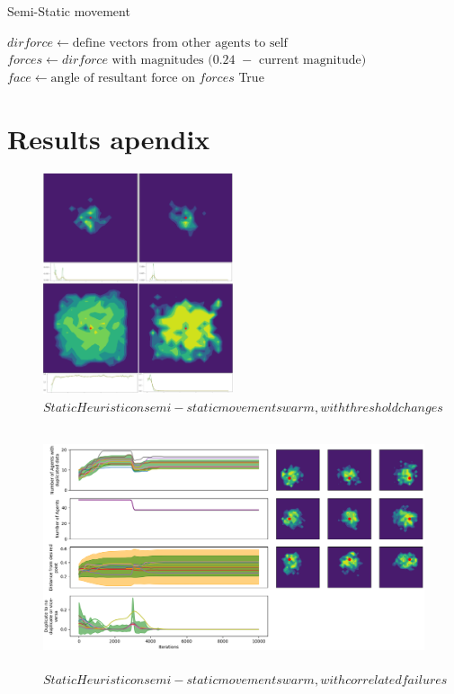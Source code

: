 \documentclass{UoYCSproject}
\begin{document}
\begin{algorithm}
\caption{Semi-Static movement}
\label{semistaticmove}
\begin{algorithmic}[1]
\State $dirforce \gets \text{define vectors from other agents to self}$
\State $forces \gets \text{$dirforce$ with magnitudes $($0.24 $-$ current magnitude$)$}$
\State
\State {}
\State
\State $face \gets \text{angle of resultant force on $forces$}$
\State {}
\State
\State \Return True
\EndProcedure
\end{algorithmic}
\end{algorithm}


\chapter{Results apendix}

\begin{figure}[htb]
\label{fig:Threshold_Changes}
\begin{center}
\centering
\includegraphics[height=6.5cm]{"./Static_Heuristic/Threshold_Changes.png"}
\caption{$Static Heuristic on semi-static movement swarm, with threshold changes$}
\end{center}
\end{figure}

\begin{figure}[htb]
\label{fig:static_movement_con}
\begin{center}
\centering
\includegraphics[height=7cm]{"./Static_Heuristic/static_movement_con.png"}
\caption{$Static Heuristic on semi-static movement swarm, with correlated failures$}
\end{center}
\end{figure}
\end{document}
